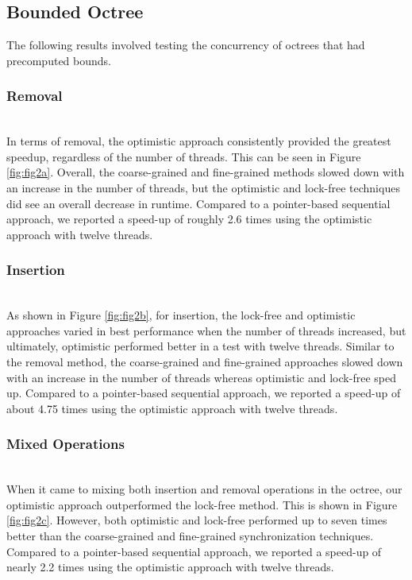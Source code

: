 \documentclass[conference]{IEEEtran}
\begin{document}
\subsection{Bounded Octree} %
The following results involved testing the concurrency of octrees that had precomputed bounds.
\subsubsection{Removal}~\\
\indent \indent In terms of removal, the optimistic approach consistently provided the greatest speedup, regardless of the number of threads. This can be seen in Figure \ref{fig:fig2a}. Overall, the coarse-grained and fine-grained methods slowed down with an increase in the number of threads, but the optimistic and lock-free techniques did see an overall decrease in runtime. Compared to a pointer-based sequential approach, we reported a speed-up of roughly 2.6 times using the optimistic approach with twelve threads.

\subsubsection{Insertion}~\\
\indent \indent As shown in Figure \ref{fig:fig2b}, for insertion, the lock-free and optimistic approaches varied in best performance when the number of threads increased, but ultimately, optimistic performed better in a test with twelve threads. Similar to the removal method, the coarse-grained and fine-grained approaches slowed down with an increase in the number of threads whereas optimistic and lock-free sped up. Compared to a pointer-based sequential approach, we reported a speed-up of about 4.75 times using the optimistic approach with twelve threads.

\subsubsection{Mixed Operations}~\\
 \indent \indent When it came to mixing both insertion and removal operations in the octree, our optimistic approach outperformed the lock-free method. This is shown in Figure \ref{fig:fig2c}. However, both optimistic and lock-free performed up to seven times better than the coarse-grained and fine-grained synchronization techniques. Compared to a pointer-based sequential approach, we reported a speed-up of nearly 2.2 times using the optimistic approach with twelve threads.
\end{document}
